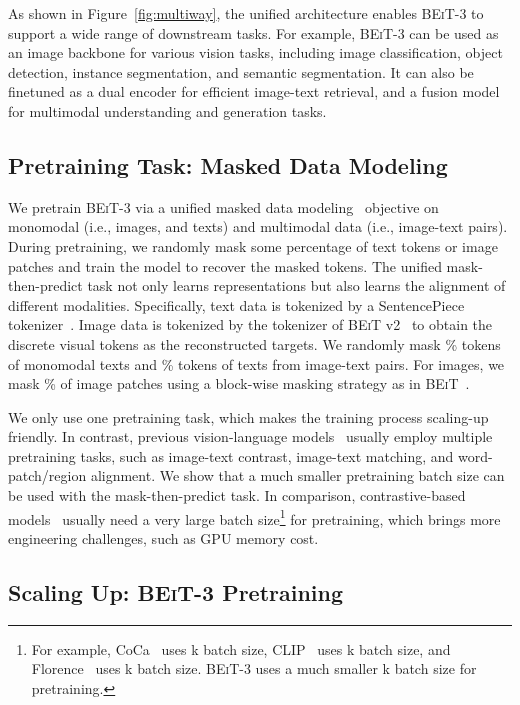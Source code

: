 \documentclass{article}
\newcommand\our{\textsc{BEiT-3}}
\newcommand\beit{\textsc{BEiT}}
\begin{document}
As shown in Figure~\ref{fig:multiway}, the unified architecture enables \our{} to support a wide range of downstream tasks.
For example, \our{} can be used as an image backbone for various vision tasks, including image classification, object detection, instance segmentation, and semantic segmentation.
It can also be finetuned as a dual encoder for efficient image-text retrieval, and a fusion model for multimodal understanding and generation tasks.


\subsection{Pretraining Task: Masked Data Modeling}

We pretrain \our{} via a unified masked data modeling~\citep{vlbeit} objective on monomodal (i.e., images, and texts) and multimodal data (i.e., image-text pairs).
During pretraining, we randomly mask some percentage of text tokens or image patches and train the model to recover the masked tokens.
The unified mask-then-predict task not only learns representations but also learns the alignment of different modalities.
Specifically, text data is tokenized by a SentencePiece tokenizer~\citep{sentencepiece}.
Image data is tokenized by the tokenizer of \beit{} v2~\citep{beitv2} to obtain the discrete visual tokens as the reconstructed targets.
We randomly mask \% tokens of monomodal texts and \% tokens of texts from image-text pairs.
For images, we mask \% of image patches using a block-wise masking strategy as in \beit{}~\citep{beit,beitv2}.

We only use one pretraining task, which makes the training process scaling-up friendly. In contrast, previous vision-language models~\citep{oscar,vinvl,vilt,albef,vlmo,blip,coca} usually employ multiple pretraining tasks, such as image-text contrast, image-text matching, and word-patch/region alignment.
We show that a much smaller pretraining batch size can be used with the mask-then-predict task.
In comparison, contrastive-based models~\cite{clip,align,florence,coca} usually need a very large batch size\footnote{For example, CoCa~\citep{coca} uses k batch size, CLIP~\citep{clip} uses k batch size, and Florence~\citep{florence} uses k batch size. \our{} uses a much smaller k batch size for pretraining.} for pretraining, which brings more engineering challenges, such as GPU memory cost.


\subsection{Scaling Up: \our{} Pretraining}
\end{document}
